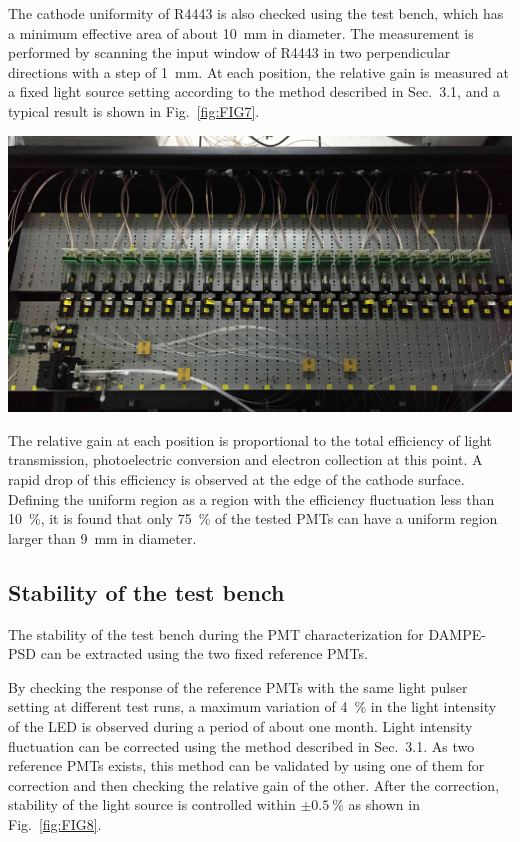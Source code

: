 \documentclass[a4paper,10pt,twoside]{cpc-hepnp}
\begin{document}
\begin{CJK*}{UTF8}{gbsn}
\begin{multicols}{2}
The cathode uniformity of R4443 is also checked using the test bench, which has a minimum effective area of about \SI{10}{\milli\meter} in diameter.
The measurement is performed by scanning the input window of R4443 in two perpendicular directions with a step of \SI{1}{\milli\meter}.
At each position, the relative gain is measured at a fixed light source setting according to the method described in Sec.~3.1, and a typical result is shown in Fig.~\ref{fig:FIG7}.

\begin{center}
	\includegraphics[width=\linewidth]{FIG7}
\end{center} 

The relative gain at each position is proportional to the total efficiency of light transmission, photoelectric conversion and electron collection at this point.
A rapid drop of this efficiency is observed at the edge of the cathode surface. 
Defining the uniform region as a region with the efficiency fluctuation less than \SI{10}{\percent}, it is found that only \SI{75}{\percent} of the tested PMTs can have a uniform region larger than \SI{9}{\milli\meter} in diameter. 


\subsection{Stability of the test bench}
\label{sec:stability}

The stability of the test bench during the PMT characterization for DAMPE-PSD can be extracted using the two fixed reference PMTs.

By checking the response of the reference PMTs with the same light pulser setting at different test runs, a maximum variation of \SI{4}{\percent} in the light intensity of the LED is observed during a period of about one month.
Light intensity fluctuation can be corrected using the method described in Sec.~3.1.
As two reference PMTs exists, this method can be validated by using one of them for correction and then checking the relative gain of the other. 
After the correction, stability of the light source is controlled within $\pm\SI{0.5}{\percent}$ as shown in Fig.~\ref{fig:FIG8}.


\end{multicols}
\end{CJK*}
\end{document}
